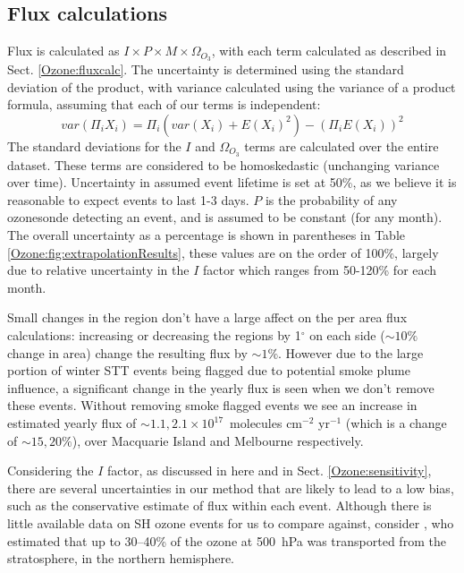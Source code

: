   \subsection{Flux calculations}
    \label{Ozone:fluxuncertainty}
    Flux is calculated as $ I \times P \times M \times \Omega_{O_3}$, with each term calculated as described in Sect. \ref{Ozone:fluxcalc}.
    The uncertainty is determined using the standard deviation of the product, with variance calculated using the variance of a product formula, assuming that each of our terms is independent: 
    \begin{equation*} var(\Pi_i X_i) = \Pi_i ( var(X_i) + E(X_i)^2 ) - (\Pi_i E(X_i))^2 \end{equation*}
    The standard deviations for the $I$ and $\Omega_{O_3}$ terms are calculated over the entire dataset.
    These terms are considered to be homoskedastic (unchanging variance over time).
    Uncertainty in assumed event lifetime is set at 50\%, as we believe it is reasonable to expect events to last 1-3 days.
    $P$ is the probability of any ozonesonde detecting an event, and is assumed to be constant (for any month).
    The overall uncertainty as a percentage is shown in parentheses in Table \ref{Ozone:fig:extrapolationResults}, these values are on the order of 100\%, largely due to relative uncertainty in the $I$ factor which ranges from 50-120\% for each month.
    
    Small changes in the region don't have a large affect on the per area flux calculations: increasing or decreasing the regions by 1$^{\circ}$ on each side ($\sim 10\%$ change in area) change the resulting flux by $\sim 1\%$. %
    However due to the large portion of winter STT events being flagged due to potential smoke plume influence, a significant change in the yearly flux is seen when we don't remove these events.
    Without removing smoke flagged events we see an increase in estimated yearly flux of $\sim 1.1, 2.1 \times 10^{17} $~molecules cm$^{-2}$ yr$^{-1}$ (which is a change of $\sim 15, 20\%$), over Macquarie Island and Melbourne respectively.
    
    Considering the $I$ factor, as discussed in here and in Sect. \ref{Ozone:sensitivity}, there are several uncertainties in our method that are likely to lead to a low bias, such as the conservative estimate of flux within each event.
    Although there is little available data on SH ozone events for us to compare against, consider \citet{Terao2008}, who estimated that up to 30--40\% of the ozone at 500~hPa was transported from the stratosphere, in the northern hemisphere.
    
